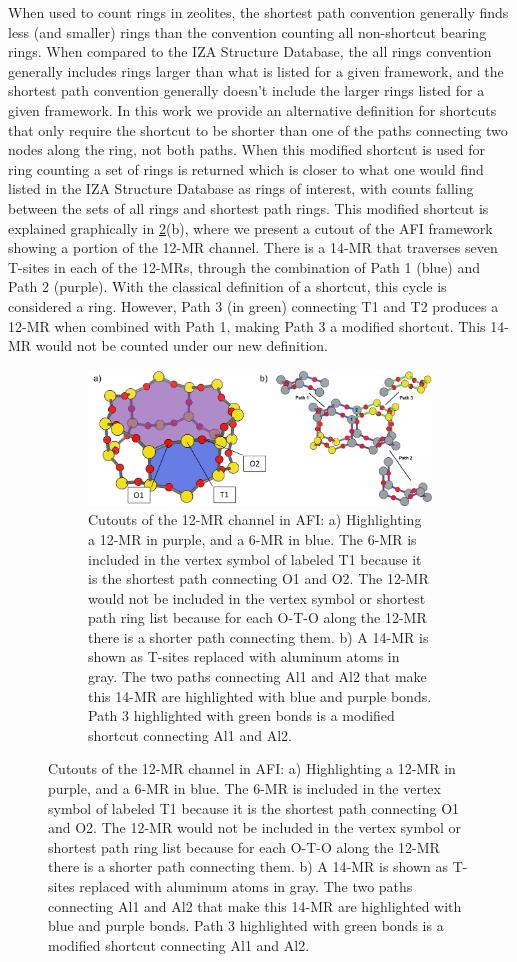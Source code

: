 \documentclass[preprint,numrefs,noinfo,sort&compress]{elsarticle}
\begin{document}
When used to count rings in zeolites, the shortest path convention generally finds less (and smaller) rings than the convention counting all non-shortcut bearing rings. When compared to the IZA Structure Database, the all rings convention generally includes rings larger than what is listed for a given framework, and the shortest path convention generally doesn't include the larger rings listed for a given framework. In this work we provide an alternative definition for shortcuts that only require the shortcut to be shorter than one of the paths connecting two nodes along the ring, not both paths. When this modified shortcut is used for ring counting a set of rings is returned which is closer to what one would find listed in the IZA Structure Database as rings of interest, with counts falling between the sets of all rings and shortest path rings. This modified shortcut is explained graphically in \cref{fig:3.3}(b), where we present a cutout of the AFI framework showing a portion of the 12-MR channel. There is a 14-MR that traverses seven T-sites in each of the 12-MRs, through the combination of Path 1 (blue) and Path 2 (purple). With the classical definition of a shortcut, this cycle is considered a ring. However, Path 3 (in green) connecting T1 and T2 produces a 12-MR when combined with Path 1, making Path 3 a modified shortcut. This 14-MR would not be counted under our new definition. 

\begin{figure}
\begin{figure}[H]
\centering
\includegraphics[width=\textwidth]{figures/chapter-3/afi-14-and-modified.pdf}
\caption{Cutouts of the 12-MR channel in AFI: a) Highlighting a 12-MR in purple, and a 6-MR in blue. The 6-MR is included in the vertex symbol of labeled T1 because it is the shortest path connecting O1 and O2. The 12-MR would not be included in the vertex symbol or shortest path ring list because for each O-T-O along the 12-MR there is a shorter path connecting them. b) A 14-MR is shown as T-sites replaced with aluminum atoms in gray. The two paths connecting Al1 and Al2 that make this 14-MR are highlighted with blue and purple bonds. Path 3 highlighted with green bonds is a modified shortcut connecting Al1 and Al2. \label{fig:3.3}}
\end{figure}
\end{figure}
\end{document}
